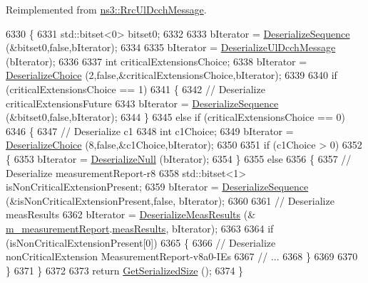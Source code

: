 Reimplemented from \hyperlink{classns3_1_1RrcUlDcchMessage_a76f7263f39a6dbb893a42300d4e72e09}{ns3\+::\+Rrc\+Ul\+Dcch\+Message}.


\begin{DoxyCode}
6330 \{
6331   std::bitset<0> bitset0;
6332 
6333   bIterator = \hyperlink{classns3_1_1Asn1Header_a58c68bb97ba3fe2e8fcdd7c208d672b2}{DeserializeSequence} (&bitset0,\textcolor{keyword}{false},bIterator);
6334 
6335   bIterator = \hyperlink{classns3_1_1RrcUlDcchMessage_a11b944acd9ea5a459cc49a9fa11c3161}{DeserializeUlDcchMessage} (bIterator);
6336 
6337   \textcolor{keywordtype}{int} criticalExtensionsChoice;
6338   bIterator = \hyperlink{classns3_1_1Asn1Header_a0af5881f07a0549a8693a1b75c229a90}{DeserializeChoice} (2,\textcolor{keyword}{false},&criticalExtensionsChoice,bIterator);
6339 
6340   \textcolor{keywordflow}{if} (criticalExtensionsChoice == 1)
6341     \{
6342       \textcolor{comment}{// Deserialize criticalExtensionsFuture}
6343       bIterator = \hyperlink{classns3_1_1Asn1Header_a58c68bb97ba3fe2e8fcdd7c208d672b2}{DeserializeSequence} (&bitset0,\textcolor{keyword}{false},bIterator);
6344     \}
6345   \textcolor{keywordflow}{else} \textcolor{keywordflow}{if} (criticalExtensionsChoice == 0)
6346     \{
6347       \textcolor{comment}{// Deserialize c1}
6348       \textcolor{keywordtype}{int} c1Choice;
6349       bIterator = \hyperlink{classns3_1_1Asn1Header_a0af5881f07a0549a8693a1b75c229a90}{DeserializeChoice} (8,\textcolor{keyword}{false},&c1Choice,bIterator);
6350 
6351       \textcolor{keywordflow}{if} (c1Choice > 0)
6352         \{
6353           bIterator = \hyperlink{classns3_1_1Asn1Header_a29bd4508f3f1ef636b3480f524fac0ce}{DeserializeNull} (bIterator);
6354         \}
6355       \textcolor{keywordflow}{else}
6356         \{
6357           \textcolor{comment}{// Deserialize measurementReport-r8}
6358           std::bitset<1> isNonCriticalExtensionPresent;
6359           bIterator = \hyperlink{classns3_1_1Asn1Header_a58c68bb97ba3fe2e8fcdd7c208d672b2}{DeserializeSequence} (&isNonCriticalExtensionPresent,\textcolor{keyword}{false},
      bIterator);
6360 
6361           \textcolor{comment}{// Deserialize measResults}
6362           bIterator = \hyperlink{classns3_1_1RrcAsn1Header_a656187c4af13c81062863e6920989d06}{DeserializeMeasResults} (&
      \hyperlink{classns3_1_1MeasurementReportHeader_a7836c0f2ef3e219fc7ab0fee92e470f5}{m\_measurementReport}.\hyperlink{structns3_1_1LteRrcSap_1_1MeasurementReport_a84a65ffec25d719fdcba03fb28ca5b86}{measResults}, bIterator);
6363 
6364           \textcolor{keywordflow}{if} (isNonCriticalExtensionPresent[0])
6365             \{
6366               \textcolor{comment}{// Deserialize nonCriticalExtension MeasurementReport-v8a0-IEs}
6367               \textcolor{comment}{// ...}
6368             \}
6369 
6370         \}
6371     \}
6372 
6373   \textcolor{keywordflow}{return} \hyperlink{classns3_1_1Asn1Header_a18a67eb7869c5784f59d197bbd76a74f}{GetSerializedSize} ();
6374 \}
\end{DoxyCode}


